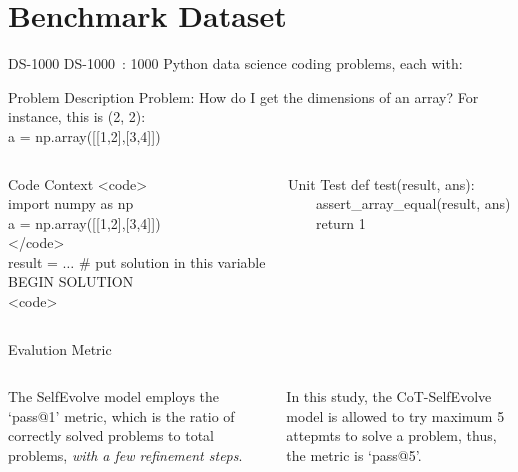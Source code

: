\section{Benchmark Dataset}

\begin{frame}{DS-1000}
    DS-1000~\cite{pmlr-v202-lai23b}: 1000 Python data science coding problems, each with:
    \begin{block}{Problem Description}
        \small
        Problem:
        How do I get the dimensions of an array? For instance, this is (2, 2):\\
        a = np.array([[1,2],[3,4]])
    \end{block}

    \begin{columns}[T]
        \begin{column}{0.50\textwidth}
            \begin{block}{Code Context}
                \small
                <code>\\
                import numpy as np\\
                a = np.array([[1,2],[3,4]])\\
                </code>\\
                result = $\ldots$ \# put solution in this variable\\
                BEGIN SOLUTION\\
                <code>
            \end{block}
        \end{column}
        \begin{column}{0.45\textwidth}
            \begin{block}{Unit Test}
                \small
                def test(result, ans):\\
                \ \ \ \ assert\_array\_equal(result, ans)\\
                \ \ \ \ return 1
            \end{block}
        \end{column}
    \end{columns}
\end{frame}

\begin{frame}{Evalution Metric}
    \begin{columns}[T] %
        \begin{column}{.5\textwidth}
            The SelfEvolve model employs the `pass@1' metric, which is the ratio of correctly solved problems to total problems, \textit{with a few refinement steps}.
        \end{column}%
        \begin{column}{.5\textwidth}
            In this study, the CoT-SelfEvolve model is allowed to try maximum 5 attepmts to solve a problem, thus, the metric is `pass@5'.
        \end{column}%
    \end{columns}
\end{frame}
